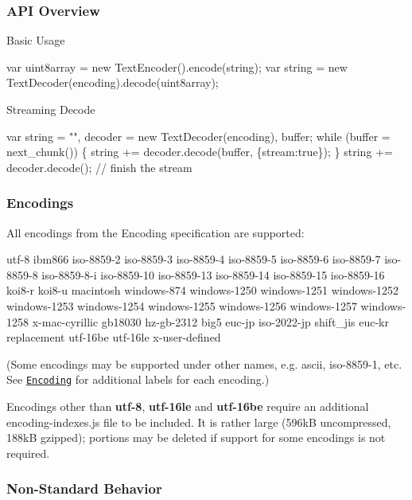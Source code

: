 \subsubsection*{A\+PI Overview}

Basic Usage


\begin{DoxyCode}
var uint8array = new TextEncoder().encode(string);
var string = new TextDecoder(encoding).decode(uint8array);
\end{DoxyCode}


Streaming Decode


\begin{DoxyCode}
var string = "", decoder = new TextDecoder(encoding), buffer;
while (buffer = next\_chunk()) \{
  string += decoder.decode(buffer, \{stream:true\});
\}
string += decoder.decode(); // finish the stream
\end{DoxyCode}


\subsubsection*{Encodings}

All encodings from the Encoding specification are supported\+:

utf-\/8 ibm866 iso-\/8859-\/2 iso-\/8859-\/3 iso-\/8859-\/4 iso-\/8859-\/5 iso-\/8859-\/6 iso-\/8859-\/7 iso-\/8859-\/8 iso-\/8859-\/8-\/i iso-\/8859-\/10 iso-\/8859-\/13 iso-\/8859-\/14 iso-\/8859-\/15 iso-\/8859-\/16 koi8-\/r koi8-\/u macintosh windows-\/874 windows-\/1250 windows-\/1251 windows-\/1252 windows-\/1253 windows-\/1254 windows-\/1255 windows-\/1256 windows-\/1257 windows-\/1258 x-\/mac-\/cyrillic gb18030 hz-\/gb-\/2312 big5 euc-\/jp iso-\/2022-\/jp shift\+\_\+jis euc-\/kr replacement utf-\/16be utf-\/16le x-\/user-\/defined

(Some encodings may be supported under other names, e.\+g. ascii, iso-\/8859-\/1, etc. See \href{https://encoding.spec.whatwg.org/}{\tt Encoding} for additional labels for each encoding.)

Encodings other than {\bfseries utf-\/8}, {\bfseries utf-\/16le} and {\bfseries utf-\/16be} require an additional {\ttfamily encoding-\/indexes.\+js} file to be included. It is rather large (596kB uncompressed, 188kB gzipped); portions may be deleted if support for some encodings is not required.

\subsubsection*{Non-\/\+Standard Behavior}

